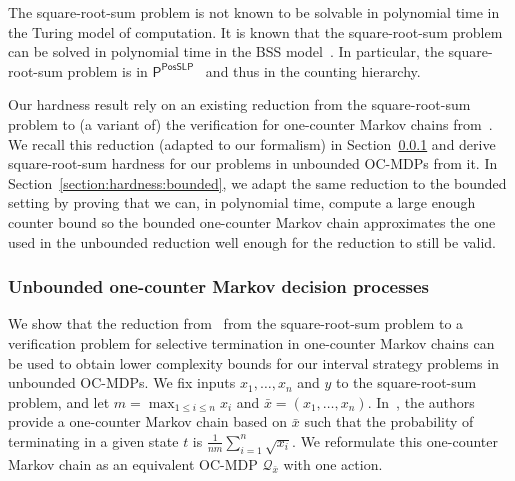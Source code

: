 \documentclass[a4paper,UKenglish,cleveref,autoref,thm-restate,colorlinks]{lipics-v2021}
\newcommand{\ptime}{\textsf{P}}
\newcommand{\posSLP}{\textsf{PosSLP}}
\newcommand{\sqsx}{x} \newcommand{\sqsxVect}{\bar{x}} \newcommand{\sqsm}{m} \newcommand{\sqsy}{y} \newcommand{\sqsi}{i} \newcommand{\sqsn}{n} \newcommand{\sqsSize}{E}
\newcommand{\ocmdp}{\mathcal{Q}}
\newcommand{\ocStateC}{t}
\newcommand{\chainX}{\ocmdp_{\sqsxVect}}
\begin{document}
The square-root-sum problem is not known to be solvable in polynomial time in the Turing model of computation.
It is known that the square-root-sum problem can be solved in polynomial time in the BSS model~\cite{DBLP:journals/jc/Tiwari92}.
In particular, the square-root-sum problem is in $\ptime^\posSLP$~\cite{DBLP:journals/siamcomp/AllenderBKM09} and thus in the counting hierarchy.

Our hardness result rely on an existing reduction from the square-root-sum problem to (a variant of) the verification for one-counter Markov chains from~\cite{DBLP:journals/pe/EtessamiWY10}.
We recall this reduction (adapted to our formalism) in Section~\ref{section:hardness:unbounded} and derive square-root-sum hardness for our problems in unbounded OC-MDPs from it.
In Section~\ref{section:hardness:bounded}, we adapt the same reduction to the bounded setting by proving that we can, in polynomial time, compute a large enough counter bound so the bounded one-counter Markov chain approximates the one used in the unbounded reduction well enough for the reduction to still be valid.

\subsubsection{Unbounded one-counter Markov decision processes}\label{section:hardness:unbounded}

We show that the reduction from~\cite{DBLP:journals/pe/EtessamiWY10} from the square-root-sum problem to a verification problem for selective termination in one-counter Markov chains can be used to obtain lower complexity bounds for our interval strategy problems in unbounded OC-MDPs.
We fix inputs $\sqsx_1, \ldots, \sqsx_\sqsn$ and $\sqsy$ to the square-root-sum problem, and let $\sqsm = \max_{1\leq\sqsi\leq\sqsn}\sqsx_\sqsi$ and $\sqsxVect = (\sqsx_1,\ldots, \sqsx_\sqsn)$.
In~\cite{DBLP:journals/pe/EtessamiWY10}, the authors provide a one-counter Markov chain based on $\sqsxVect$ such that the probability of terminating in a given state $\ocStateC$ is $\frac{1}{\sqsn\sqsm}\sum_{\sqsi=1}^\sqsn\sqrt{\sqsx_\sqsi}$.
We reformulate this one-counter Markov chain as an equivalent OC-MDP $\chainX$ with one action.
\end{document}
